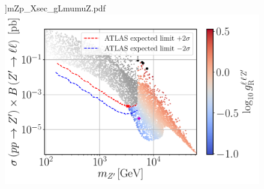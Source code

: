 \documentclass[10pt,xcolor=dvipsnames,mathserif]{beamer}
\renewcommand{\(}{\left(}
\renewcommand{\)}{\right)}
\renewcommand{\[}{\left[}
\renewcommand{\]}{\right]}
\begin{document}
\begin{frame}
\begin{figure}[!h]
	]{mZp_Xsec_gLmumuZ.pdf}~
	\includegraphics[scale=0.27
	]{mZp_Xsec_gRmumuZ.pdf}
\end{figure}	
\end{frame}
\end{document}
